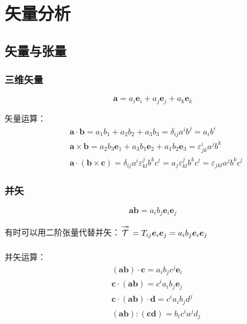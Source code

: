 \documentclass[main.tex]{subfiles}
\begin{document}
\chapter{矢量分析}

\section{矢量与张量}

\subsection{三维矢量}
$$\boldsymbol{a} = a_i\boldsymbol{e}_i+a_j\boldsymbol{e}_j+a_k\boldsymbol{e}_k$$

矢量运算：
\begin{align}
    &\boldsymbol{a} \cdot \boldsymbol{b} = a_1b_1+a_2b_2+a_3b_3 = \delta _{ij} a^ib^j = a_i b^i\\
    &\boldsymbol{a} \times \boldsymbol{b} = a_2b_3\boldsymbol{e}_1+a_3b_1\boldsymbol{e}_2+a_1b_2\boldsymbol{e}_3 = \varepsilon ^i_{jk}a^jb^k \\
    &\boldsymbol{a} \cdot (\boldsymbol{b} \times \boldsymbol{c}) = \delta _{ij}a^i\varepsilon ^j_{kl}b^kc^l = a_j\varepsilon ^j_{kl}b^kc^l = \varepsilon _{jkl}a^jb^kc^l
\end{align}

\subsection{并矢}
$$\boldsymbol{a}\boldsymbol{b} = a_ib_j\boldsymbol{e}_i\boldsymbol{e}_j$$

有时可以用二阶张量代替并矢：${\substack{\displaystyle\twoheadrightarrow\atop\displaystyle{\mathcal{T}}\\[0.624em]~}} = T_{ij}\boldsymbol{e}_i\boldsymbol{e}_j = a_ib_j\boldsymbol{e}_i\boldsymbol{e}_j$

并矢运算：
\begin{align}
    &(\boldsymbol{a}\boldsymbol{b})\cdot \boldsymbol{c} = a_i b_j c^j \boldsymbol{e}_i \\
    &\boldsymbol{c}\cdot (\boldsymbol{a}\boldsymbol{b}) = c^i a_i b_j \boldsymbol{e}_j \\
    &\boldsymbol{c}\cdot (\boldsymbol{a}\boldsymbol{b}) \cdot \boldsymbol{d} = c^i a_i b_j d^j \\
    &(\boldsymbol{a}\boldsymbol{b}):(\boldsymbol{c}\boldsymbol{d}) = b_i c^i a^j d_j 
\end{align}
\end{document}

